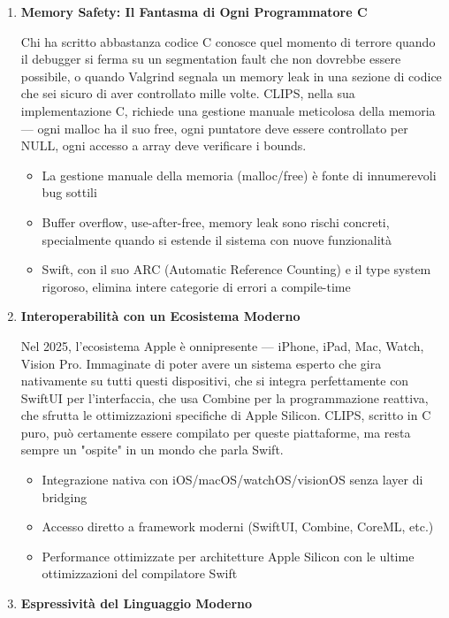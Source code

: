 \begin{enumerate}
\item \textbf{Memory Safety: Il Fantasma di Ogni Programmatore C}

Chi ha scritto abbastanza codice C conosce quel momento di terrore quando il debugger si ferma su un segmentation fault che non dovrebbe essere possibile, o quando Valgrind segnala un memory leak in una sezione di codice che sei sicuro di aver controllato mille volte. CLIPS, nella sua implementazione C, richiede una gestione manuale meticolosa della memoria — ogni malloc ha il suo free, ogni puntatore deve essere controllato per NULL, ogni accesso a array deve verificare i bounds.

\begin{itemize}
\item La gestione manuale della memoria (malloc/free) è fonte di innumerevoli bug sottili
\item Buffer overflow, use-after-free, memory leak sono rischi concreti, specialmente quando si estende il sistema con nuove funzionalità
\item Swift, con il suo ARC (Automatic Reference Counting) e il type system rigoroso, elimina intere categorie di errori a compile-time
\end{itemize}

\item \textbf{Interoperabilità con un Ecosistema Moderno}

Nel 2025, l'ecosistema Apple è onnipresente — iPhone, iPad, Mac, Watch, Vision Pro. Immaginate di poter avere un sistema esperto che gira nativamente su tutti questi dispositivi, che si integra perfettamente con SwiftUI per l'interfaccia, che usa Combine per la programmazione reattiva, che sfrutta le ottimizzazioni specifiche di Apple Silicon. CLIPS, scritto in C puro, può certamente essere compilato per queste piattaforme, ma resta sempre un "ospite" in un mondo che parla Swift.

\begin{itemize}
\item Integrazione nativa con iOS/macOS/watchOS/visionOS senza layer di bridging
\item Accesso diretto a framework moderni (SwiftUI, Combine, CoreML, etc.)
\item Performance ottimizzate per architetture Apple Silicon con le ultime ottimizzazioni del compilatore Swift
\end{itemize}

\item \textbf{Espressività del Linguaggio Moderno}


\end{enumerate}
